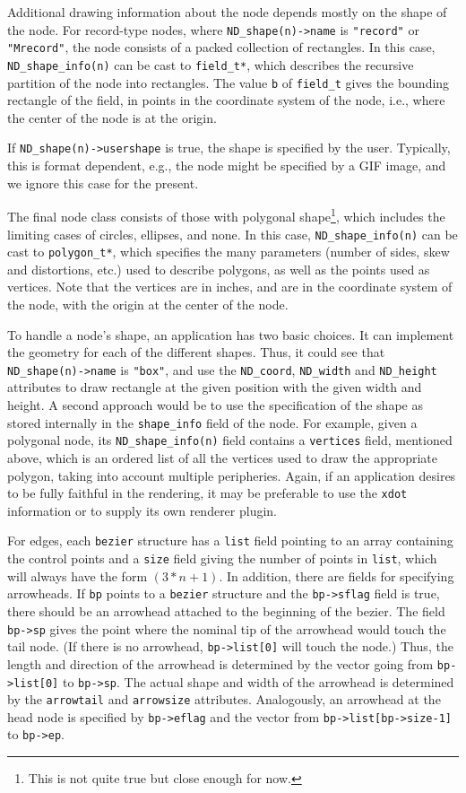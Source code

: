 Additional drawing information about the node depends mostly on the shape
of the node. 
For record-type nodes, where \verb+ND_shape(n)->name+ is {\tt "record"} or 
{\tt "Mrecord"}, the node consists of a packed collection
of rectangles. In this case, \verb+ND_shape_info(n)+ can be cast to
\verb+field_t*+, which describes the recursive partition of the node
into rectangles. The value {\tt b} of \verb+field_t+
gives the bounding rectangle of the field, in points in the coordinate
system of the node, i.e., where the center of the node is at the
origin. 

If \verb+ND_shape(n)->usershape+ is true, the shape
is specified by the user. Typically, this is format dependent, e.g.,
the node might be specified by a GIF image, and we ignore this case
for the present. 

The final node class consists of those with polygonal shape\footnote{This
is not quite true but close enough for now.}, which includes the limiting
cases of circles, ellipses, and none. In this case,
\verb+ND_shape_info(n)+ can be cast to \verb+polygon_t*+, which specifies
the many parameters (number of sides, skew and distortions, etc.)
used to describe polygons, as well as the points used as vertices. 
Note that the vertices are in inches, and are in the coordinate system
of the node, with the origin at the center of the node.

To handle a node's shape, an application has two basic choices. It
can implement the geometry for each of the different shapes.
Thus, it could see that \verb+ND_shape(n)->name+ is {\tt "box"}, and
use the {\tt ND\_coord}, {\tt ND\_width} and {\tt ND\_height} attributes to draw
rectangle at the given position with the given width and  height.
A second approach would be
to use the specification of the shape as stored internally in the
{\tt shape\_info} field of the node. For example, given a polygonal node,
its \verb+ND_shape_info(n)+ field contains a {\tt vertices} field,
mentioned above, which is an ordered list of all the vertices used
to draw the appropriate polygon, taking into account multiple peripheries. 
Again, if an application desires to be fully faithful in the rendering,
it may be preferable to use the {\tt xdot} information or to supply its
own renderer plugin.

For edges, each {\tt bezier} structure has a \verb+list+ field pointing to
an array containing the control points and a \verb+size+ field giving the 
number of points in \verb+list+, which will always have the form $(3*n+1)$. 
In addition, there are
fields for specifying arrowheads. If {\tt bp} points to
a {\tt bezier} structure and the {\tt bp->sflag} field is
true, there should be an arrowhead attached to the beginning of the bezier.
The field {\tt bp->sp} gives the point where the nominal tip of the arrowhead
would touch the tail node. (If there is no arrowhead, {\tt bp->list[0]} will
touch the node.) Thus, the length and direction of the arrowhead
is determined by the vector going from {\tt bp->list[0]} to {\tt bp->sp}. 
The actual
shape and width of the arrowhead is determined by the {\tt arrowtail} and
{\tt arrowsize} attributes. Analogously, an arrowhead at the head node is
specified by {\tt bp->eflag} and the vector 
from {\tt bp->list[bp->size-1]} to {\tt bp->ep}.

